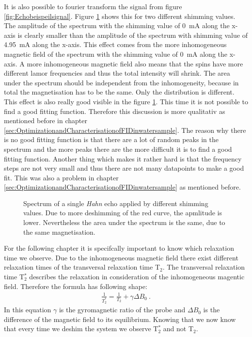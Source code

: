 It is also possible to fourier transform the signal from figure \ref{fig:Echobeispeilsignal}. Figure \ref{fig:SpinEcho} shows this for two different shimming values. The amplitude of the spectrum with the shimming value of \SI{0}{\milli \ampere} along the x-axis is clearly smaller than the amplitude of the spectrum with shimming value of \SI{4.95}{\milli \ampere} along the x-axis. This effect comes from the more inhomogeneous magnetic field of the spectrum with the shimming value of \SI{0}{\milli \ampere} along the x-axis. A more inhomogeneous magnetic field also means that the spins have more different lamor frequencies and thus the total intensity will shrink. The area under the spectrum should be independent from the inhomogeneity, because in total the magnetisation has to be the same. Only the distribution is different. This effect is also really good visible in the figure \ref{fig:SpinEcho}. This time it is not possible to find a good fitting function. Therefore this discussion is more qualitativ as mentioned before in chapter \ref{sec:OptimizationandCharacterisationofFIDinwatersample}. The reason why there is no good fitting function is that there are a lot of random peaks in the spectrum and the more peaks there are the more difficult it is to find a good fitting function. Another thing which makes it rather hard is that the frequency steps are not very small and thus there are not many datapoints to make a good fit. This was also a problem in chapter \ref{sec:OptimizationandCharacterisationofFIDinwatersample} as mentioned before.
\begin{figure}[H]
    \centering
    
    \caption[Spectrum of a single \textit{Hahn} echo applied by different shimming values.]{Spectrum of a single \textit{Hahn} echo applied by different shimming values. Due to more deshimming of the red curve, the apmlitude is lower. Nevertheless the area under the spectrum is the same, due to the same magnetisation.}
    \label{fig:SpinEcho}
\end{figure}
For the following chapter it is specifcally important to know which relaxation time we observe. Due to the inhomogeneous magnetic field there exist different relaxation times of the transversal relaxation time T$_2$. The transversal relaxation time T$_2^*$ describes the relaxation in consideration of the inhomogeneous magentic field. Therefore the formula has following shape:
\begin{align}
    \frac{1}{T_2^*} = \frac{1}{T_2} + \gamma \Delta B_0 \ .
    \label{eq: T2}
\end{align}
In this equation $\gamma$ is the gyromagnetic ratio of the probe and $\Delta B_0$ is the difference of the magnetic field to its equilibrium. Knowing that we now know that every time we deshim the system we observe T$_2^*$ and not T$_2$.
